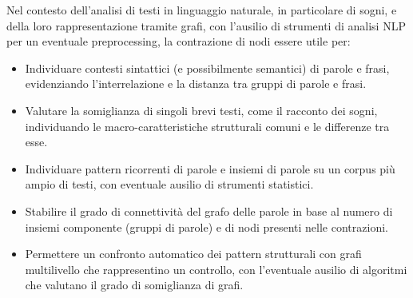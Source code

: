 Nel contesto dell'analisi di testi in linguaggio naturale, in particolare di sogni, e della loro rappresentazione
tramite grafi, con l'ausilio di strumenti di analisi NLP per un eventuale preprocessing, la contrazione di
nodi essere utile per:
\begin{itemize}
    \item Individuare contesti sintattici (e possibilmente semantici) di parole e frasi, evidenziando l'interrelazione
    e la distanza tra gruppi di parole e frasi.
    \item Valutare la somiglianza di singoli brevi testi, come il racconto dei sogni, individuando le
    macro-caratteristiche strutturali comuni e le differenze tra esse.
    \item Individuare pattern ricorrenti di parole e insiemi di parole su un corpus pi\`u ampio di testi, con
    eventuale ausilio di strumenti statistici.
    \item Stabilire il grado di connettivit\`a del grafo delle parole in base al numero di insiemi componente
    (gruppi di parole) e di nodi presenti nelle contrazioni.
    \item Permettere un confronto automatico dei pattern strutturali con grafi multilivello che rappresentino
    un controllo, con l'eventuale ausilio di algoritmi che valutano il grado di somiglianza di grafi.
\end{itemize}

